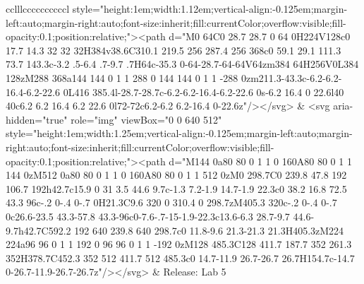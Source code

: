 \documentclass[
]{article}
\begin{document}
\begin{figure*}
\begin{longtable*}{cclllccccccccccl}
style="height:1em;width:1.12em;vertical-align:-0.125em;margin-left:auto;margin-right:auto;font-size:inherit;fill:currentColor;overflow:visible;fill-opacity:0.1;position:relative;"><path d="M0 64C0 28.7 28.7 0 64 0H224V128c0 17.7 14.3 32 32 32H384v38.6C310.1 219.5 256 287.4 256 368c0 59.1 29.1 111.3 73.7 143.3c-3.2 .5-6.4 .7-9.7 .7H64c-35.3 0-64-28.7-64-64V64zm384 64H256V0L384 128zM288 368a144 144 0 1 1 288 0 144 144 0 1 1 -288 0zm211.3-43.3c-6.2-6.2-16.4-6.2-22.6 0L416 385.4l-28.7-28.7c-6.2-6.2-16.4-6.2-22.6 0s-6.2 16.4 0 22.6l40 40c6.2 6.2 16.4 6.2 22.6 0l72-72c6.2-6.2 6.2-16.4 0-22.6z"/></svg> & <svg aria-hidden="true" role="img" viewBox="0 0 640 512" style="height:1em;width:1.25em;vertical-align:-0.125em;margin-left:auto;margin-right:auto;font-size:inherit;fill:currentColor;overflow:visible;fill-opacity:0.1;position:relative;"><path d="M144 0a80 80 0 1 1 0 160A80 80 0 1 1 144 0zM512 0a80 80 0 1 1 0 160A80 80 0 1 1 512 0zM0 298.7C0 239.8 47.8 192 106.7 192h42.7c15.9 0 31 3.5 44.6 9.7c-1.3 7.2-1.9 14.7-1.9 22.3c0 38.2 16.8 72.5 43.3 96c-.2 0-.4 0-.7 0H21.3C9.6 320 0 310.4 0 298.7zM405.3 320c-.2 0-.4 0-.7 0c26.6-23.5 43.3-57.8 43.3-96c0-7.6-.7-15-1.9-22.3c13.6-6.3 28.7-9.7 44.6-9.7h42.7C592.2 192 640 239.8 640 298.7c0 11.8-9.6 21.3-21.3 21.3H405.3zM224 224a96 96 0 1 1 192 0 96 96 0 1 1 -192 0zM128 485.3C128 411.7 187.7 352 261.3 352H378.7C452.3 352 512 411.7 512 485.3c0 14.7-11.9 26.7-26.7 26.7H154.7c-14.7 0-26.7-11.9-26.7-26.7z"/></svg> & Release: Lab 5 \\ 

\end{longtable*}
\end{figure*}
\end{document}
